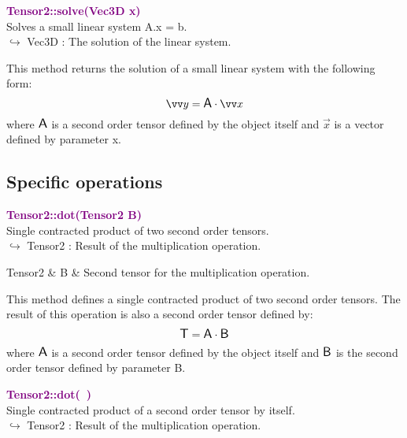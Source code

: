 \textcolor{purple}{\textbf{Tensor2::solve(Vec3D x)}}\label{Tensor2::solve(Vec3D x)}\\
Solves a small linear system A.x = b.\\ \hspace*{10mm}$\hookrightarrow$ Vec3D : The solution of the linear system.

This method returns the solution of a small linear system with the following form:
\begin{equation*}
\overrightarrow{y} = \A \cdot \overrightarrow{x}
\end{equation*}
where $\mbox{\large\ensuremath{\mathsf{A}}}$ is a second order tensor defined by the object itself and $\overrightarrow{x}$ is a vector defined by parameter x.

\subsection{Specific operations}

\textcolor{purple}{\textbf{Tensor2::dot(Tensor2 B)}}\label{Tensor2::dot(Tensor2 B)}\\
Single contracted product of two second order tensors.\\ \hspace*{10mm}$\hookrightarrow$ Tensor2 : Result of the multiplication operation.

\begin{tcolorbox}[width=\textwidth,myArgs,tabularx={ll|R}]
Tensor2 & B & Second tensor for the multiplication operation.
\end{tcolorbox}

This method defines a single contracted product of two second order tensors.
The result of this operation is also a second order tensor defined by:
\begin{equation*}
\mbox{\large\ensuremath{\mathsf{T}}} = \mbox{\large\ensuremath{\mathsf{A}}} \cdot \mbox{\large\ensuremath{\mathsf{B}}}
\end{equation*}
where $\mbox{\large\ensuremath{\mathsf{A}}}$ is a second order tensor defined by the object itself and $\mbox{\large\ensuremath{\mathsf{B}}}$ is the second order tensor defined by parameter B.

\textcolor{purple}{\textbf{Tensor2::dot(~)}}\label{Tensor2::dot()}\\
Single contracted product of a second order tensor by itself.\\ \hspace*{10mm}$\hookrightarrow$ Tensor2 : Result of the multiplication operation.


